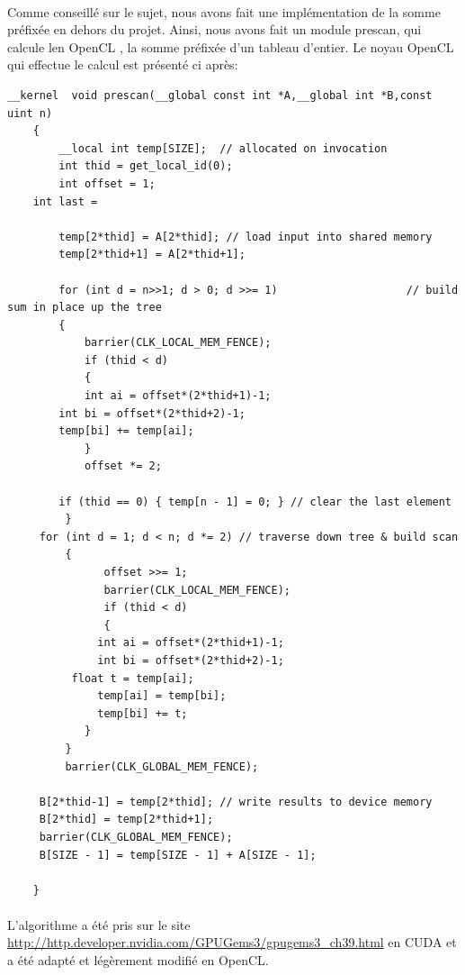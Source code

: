 \documentclass[a4paper,11pt]{report}
\begin{document}
\paragraph{}
Comme conseillé sur le sujet, nous avons fait une implémentation de la somme préfixée en dehors du projet. Ainsi, nous avons fait un module prescan, qui calcule len OpenCL , la somme préfixée d'un tableau d'entier. Le noyau OpenCL qui effectue le calcul est présenté ci après:
\vfill
\begin{lstlisting}[style=CStyle]
    __kernel  void prescan(__global const int *A,__global int *B,const  uint n)  
    {  
        __local int temp[SIZE];  // allocated on invocation  
        int thid = get_local_id(0);  
    	int offset = 1;  
	int last = 

    	temp[2*thid] = A[2*thid]; // load input into shared memory  
    	temp[2*thid+1] = A[2*thid+1];  
  	
    	for (int d = n>>1; d > 0; d >>= 1)                    // build sum in place up the tree  
    	{   
    	    barrier(CLK_LOCAL_MEM_FENCE);
       	    if (thid < d)  
       	    {  
	        int ai = offset*(2*thid+1)-1;  
		int bi = offset*(2*thid+2)-1;  
		temp[bi] += temp[ai];  		       
    	    }  
    	    offset *= 2;  
   
	    if (thid == 0) { temp[n - 1] = 0; } // clear the last element  
         }            
	 for (int d = 1; d < n; d *= 2) // traverse down tree & build scan  
    	 {  
     	       offset >>= 1;  
               barrier(CLK_LOCAL_MEM_FENCE);
               if (thid < d)                       
               {  
	       	  int ai = offset*(2*thid+1)-1;  
    	  	  int bi = offset*(2*thid+2)-1;  
		  float t = temp[ai];  
    	  	  temp[ai] = temp[bi];  
    	  	  temp[bi] += t;   
          	}  
    	 }  
     	 barrier(CLK_GLOBAL_MEM_FENCE);

	 B[2*thid-1] = temp[2*thid]; // write results to device memory  
	 B[2*thid] = temp[2*thid+1];  
	 barrier(CLK_GLOBAL_MEM_FENCE);	 
	 B[SIZE - 1] = temp[SIZE - 1] + A[SIZE - 1];

    }  
\end{lstlisting}
\paragraph{}
L'algorithme a été pris sur le site \url{http://http.developer.nvidia.com/GPUGems3/gpugems3_ch39.html} en CUDA et a été adapté et légèrement modifié en OpenCL.
\end{document}
